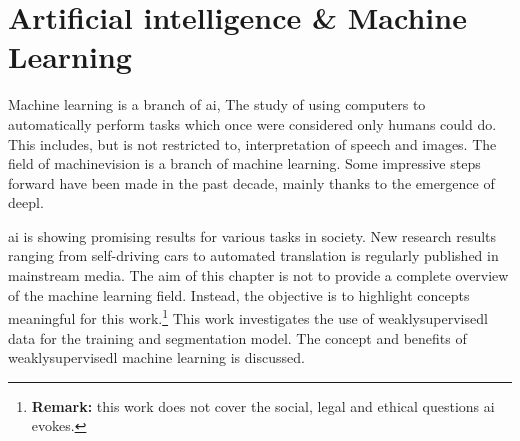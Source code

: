 \chapter{Artificial intelligence \& Machine Learning\label{sec:ai_and_ml}}
\par{
    Machine learning is a branch of \Gls{ai}, The study of using computers to automatically perform tasks which once were considered only humans could
    do. This includes, but is not restricted to, interpretation of speech and images. 
    The field of \Gls{machinevision} is a branch of machine learning.
    Some impressive steps forward have been made in the past decade, mainly thanks to the emergence of \Gls{deepl}.
}
\par{
    \Gls{ai} is showing promising results for various tasks in society.
    New research results ranging from self-driving cars to automated translation is regularly published in mainstream media.
    The aim of this chapter is not to provide a complete overview of the machine learning field.
    Instead, the objective is to highlight concepts meaningful for this work.\footnote{
        \textbf{Remark:} this work does not cover the social, legal and ethical questions \Gls{ai} evokes.
    }
    This work investigates the use of \Gls{weaklysupervisedl} data for the training and segmentation model. 
    The concept and benefits of \Gls{weaklysupervisedl} machine learning is discussed.
}

